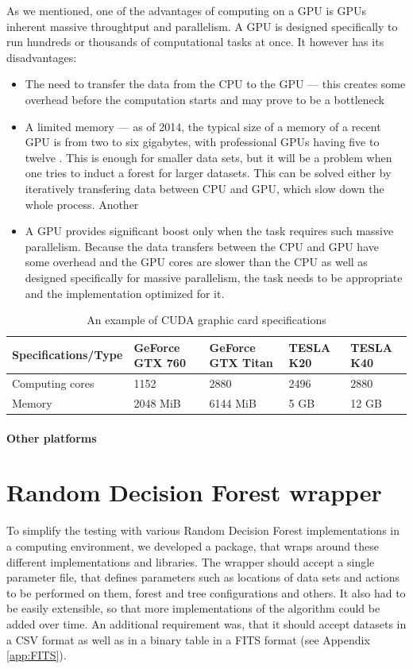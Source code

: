 \documentclass[thesis=B,english]{FITthesis}[2012/10/20]
\begin{document}
	As we mentioned, one of the advantages of computing on a GPU is GPUs inherent massive throughtput and parallelism. A GPU is designed specifically to run hundreds or thousands of computational tasks at once. It however has its disadvantages: 
	\begin{itemize}
	\item The need to transfer the data from the CPU to the GPU --- this creates some overhead before the computation starts and may prove to be a bottleneck
	\item A limited memory --- as of 2014, the typical size of a memory of a recent GPU is from two to six gigabytes, with professional GPUs having five to twelve . This is enough for smaller data sets, but it will be a problem when one tries to induct a forest for larger datasets. This can be solved either by iteratively transfering data between CPU and GPU, which slow down the whole process. Another 
	\item A GPU provides significant boost only when the task requires such massive parallelism. Because the data transfers between the CPU and GPU have some overhead and the GPU cores are slower than the CPU as well as designed specifically for massive parallelism, the task needs to be appropriate and the implementation optimized for it.
	\end{itemize}

	\begin{table}
    \begin{tabular}{|l|l|l|l|l|}
    \hline
    Specifications/Type & GeForce GTX 760 & GeForce GTX Titan & TESLA K20 & TESLA K40 \\ \hline
    Computing cores     & 1152            & 2880              & 2496             & 2880             \\ \hline
    Memory              & 2048 MiB        & 6144 MiB          & 5 GB             & 12 GB            \\ \hline
    \end{tabular}
    \caption{An example of CUDA graphic card specifications}
	\end{table}

	\subsubsection{Other platforms}

\chapter{Random Decision Forest wrapper}
\label{chap:wrapper}
To simplify the testing with various Random Decision Forest implementations in a computing environment, we developed a package, that wraps around these different implementations and libraries. The wrapper should accept a single parameter file, that defines parameters such as locations of data sets and actions to be performed on them, forest and tree configurations and others. It also had to be easily extensible, so that more implementations of the algorithm could be added over time. An additional requirement was, that it should accept datasets in a CSV format as well as in a binary table in a FITS format (see Appendix \ref{app:FITS}).
\end{document}

